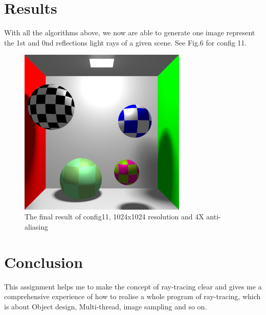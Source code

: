 \documentclass[acmtog]{acmart}
\begin{document}
\section{Results}
With all the algorithms above, we now are able to generate one image represent the 1st and 0nd reflections light rays of a given scene. See Fig.6 for config 11.
\begin{figure}[h]
		\centering
		\includegraphics[width=8cm,height=8cm]{output11_final.png}
		\caption{The final result of config11, 1024x1024 resolution and 4X anti-aliasing}
	\end{figure}

\section{Conclusion}
This assignment helps me to make the concept of ray-tracing clear and gives me a comprehensive experience of how to realise a whole program of ray-tracing, which is about Object design, Multi-thread, image sampling and so on.
\end{document}

